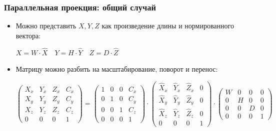 \documentclass[10pt]{beamer}
\begin{document}
\begin{frame}[fragile]
\frametitle{Параллельная проекция: общий случай}
\begin{itemize}
\item Можно представить \begin{math}X, Y, Z\end{math} как произведение длины и нормированного вектора:
\begin{center}
\begin{math}X = W \cdot \hat X \quad Y = H \cdot \hat Y \quad Z = D \cdot \hat Z\end{math}
\end{center}
\pause
\item Матрицу можно разбить на масштабирование, поворот и перенос:
\begin{center}
\begin{math}
\begin{pmatrix}
X_x & Y_x & Z_x & C_x \\
X_y & Y_y & Z_y & C_y \\
X_z & Y_z & Z_z & C_z \\
0 & 0 & 0 & 1
\end{pmatrix}
=
\begin{pmatrix}
1 & 0 & 0 & C_x \\
0 & 1 & 0 & C_y \\
0 & 0 & 1 & C_z \\
0 & 0 & 0 & 1
\end{pmatrix}
\cdot
\begin{pmatrix}
\hat X_x & \hat Y_x & \hat Z_x & 0 \\
\hat X_y & \hat Y_y & \hat Z_y & 0 \\
\hat X_z & \hat Y_z & \hat Z_z & 0 \\
0 & 0 & 0 & 1
\end{pmatrix}
\cdot
\begin{pmatrix}
W & 0 & 0 & 0 \\
0 & H & 0 & 0 \\
0 & 0 & D & 0 \\
0 & 0 & 0 & 1
\end{pmatrix}
\end{math}
\end{center}
\end{itemize}
\end{frame}
\end{document}
